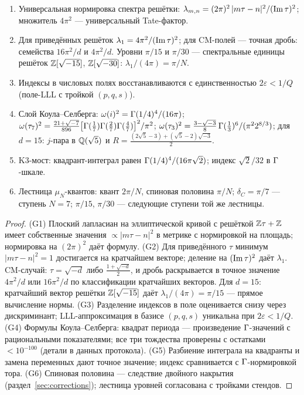 \begin{theorem}[G1--G6]\label{th:certG}
\begin{enumerate}[leftmargin=2em, itemsep=0.15em]
\item[(G1)] Универсальная нормировка спектра решётки:
  $\lambda_{m,n}=(2\pi)^2\,|m\tau-n|^2/(\operatorname{Im}\tau)^2$; множитель
  $4\pi^2$ — универсальный Tate-фактор.
\item[(G2)] Для приведённых решёток $\lambda_1=4\pi^2/(\operatorname{Im}\tau)^2$;
  для CM-полей — точная дробь: семейства $16\pi^2/d$ и $4\pi^2/d$.
  Уровни $\pi/15$ и $\pi/30$ — спектральные единицы решёток
  $\mathbb{Z}[\sqrt{-15}]$, $\mathbb{Z}[\sqrt{-30}]$: $\lambda_1/(4\pi)=\pi/N$.
\item[(G3)] Индексы в числовых полях восстанавливаются с
  единственностью $2\varepsilon<1/Q$ (поле-LLL с тройкой $(p,q,s)$).
\item[(G4)] Слой Коула--Селберга: $\omega(i)^2=\Gamma(1/4)^4/(16\pi)$;
  $\omega(\tau_7)^2=\tfrac{21+\sqrt{-7}}{896}
  \bigl[\Gamma(\tfrac17)\Gamma(\tfrac27)\Gamma(\tfrac47)\bigr]^2/\pi^2$;
  $\omega(\tau_3)^2=\tfrac{3-\sqrt{-3}}{8}\,
  \Gamma(\tfrac13)^6/(\pi^2 2^{8/3})$; для $d=15$: $j$-пара в $\mathbb{Q}(\sqrt5)$
  и $R=\tfrac{(2\sqrt5-3)+(\sqrt5-2)\sqrt{-3}}{2}$.
\item[(G5)] K3-мост: квадрант-интеграл равен
  $\Gamma(1/4)^4/(16\pi\sqrt2)$; индекс $\sqrt2/32$ в $\Gamma$-шкале.
\item[(G6)] Лестница $\mu_N$-квантов: квант $2\pi/N$, спиновая
  половина $\pi/N$; $\delta_C=\pi/7$ — ступень $N=7$; $\pi/15$,
  $\pi/30$ — следующие ступени той же лестницы.
\end{enumerate}
\end{theorem}

\begin{proof}
(G1) Плоский лапласиан на эллиптической кривой с решёткой
$\mathbb{Z}\tau+\mathbb{Z}$ имеет собственные значения $\propto|m\tau-n|^2$
в метрике с нормировкой на площадь; нормировка на $(2\pi)^2$ даёт
формулу. (G2) Для приведённого $\tau$ минимум $|m\tau-n|^2=1$
достигается на кратчайшем векторе; деление на $(\operatorname{Im}\tau)^2$ даёт
$\lambda_1$. CM-случай: $\tau=\sqrt{-d}$ либо $\tfrac{1+\sqrt{-d}}2$,
и дробь раскрывается в точное значение $4\pi^2/d$ или $16\pi^2/d$
по классификации кратчайших векторов. Для $d=15$: кратчайший вектор
решётки $\mathbb{Z}[\sqrt{-15}]$ даёт $\lambda_1/(4\pi)=\pi/15$ — прямое
вычисление нормы. (G3) Разделение индексов в поле оценивается снизу
через дискриминант; LLL-аппроксимация в базисе $(p,q,s)$ уникальна
при $2\varepsilon<1/Q$. (G4) Формулы Коула--Селберга: квадрат
периода — произведение $\Gamma$-значений с рациональными
показателями; все три тождества проверены с остатками
$<10^{-100}$ (детали в данных протокола). (G5) Разбиение
интеграла на квадранты и замена переменных дают точное значение;
индекс сравнивается с $\Gamma$-нормировкой тора. (G6) Спиновая
половина — следствие двойного накрытия (раздел~\ref{sec:corrections});
лестница уровней согласована с тройками стендов.
\end{proof}

